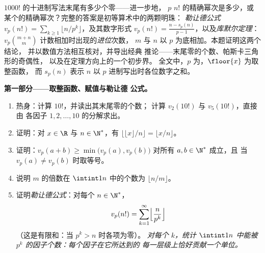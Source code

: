 \begin{problem}\label{pb:b1:arith:1}
$1000!$ 的十进制写法末尾有多少个零——进一步地，
 $p$  $n!$ 的精确幂次是多少，或
某个的精确幂次？完整的答案是初等算术中的两颗明珠：
\emph{勒让德公式}
 $v_p(n!) = \sum_{k\geq1}
\lfloor n/p^k \rfloor$，及其数字形式 $v_p(n!) = \frac{n
- s_p(n)}{p-1}$，以及\emph{库默尔定理}：$v_p\binom{m+n}m$ 计数相加时出现的\emph{进位}次数，
$m$ 与 $n$ 以 $p$ 为底相加。本题证明这两个结论，
并以数值方法相互核对，并导出经典
推论——末尾零的个数、帕斯卡三角形的奇偶性，
以及在定理方向上的一个初步界。
全文中，$p$ 为，$\floor{x}$ 为取整函数，
而 $s_p(n)$ 表示 $n$ 以 $p$ 进制写出时各位数字之和。

\medskip
\noindent\textbf{第一部分——取整函数、赋值与勒让德
公式。}
\begin{enumerate}
  \item 热身：计算 $10!$，并读出其末尾零的个数；
        计算 $v_2(10!)$ 与 $v_5(10!)$，直接由
        各因子 $1, 2, \dots, 10$ 的分解求出。
  \item 证明：对 $x \in \R$ 与 $n \in \N^*$，有
        $\bigl\lfloor \lfloor x \rfloor / n \bigr\rfloor =
        \lfloor x/n \rfloor$。
  \item 证明：$v_p(a + b) \geq \min\bigl(v_p(a),
        v_p(b)\bigr)$ 对所有 $a, b \in \N^*$ 成立，且
        当 $v_p(a) \neq v_p(b)$ 时取等号。
  \item 说明 $m$ 的倍数在 $\intint1n$ 中的个数为
        $\lfloor n/m \rfloor$。
  \item 证明\emph{勒让德公式}：对每个 $n \in \N^*$，
        \[
        v_p(n!) = \sum_{k=1}^{\infty}
        \Bigl\lfloor \frac{n}{p^k} \Bigr\rfloor
        \]
        （这是有限和：当 $p^k > n$ 时各项为零）。
        \emph{对每个 $k$，统计 $\intint1n$
        中能被 $p^k$ 的因子个数：每个因子在它所达到的
        每一层级上恰好贡献一个单位。}
\end{enumerate}


\end{problem}
